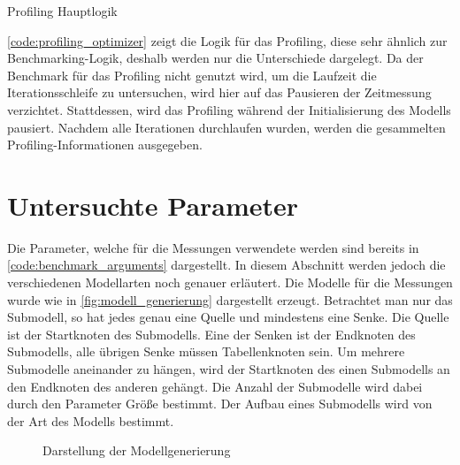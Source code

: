 \begin{listing}
    
\caption{Profiling Hauptlogik}
\label{code:profiling_optimizer}
\end{listing}

\autoref{code:profiling_optimizer} zeigt die Logik für das Profiling, diese
sehr ähnlich zur Benchmarking-Logik, deshalb werden nur die Unterschiede
dargelegt. Da der Benchmark für das Profiling nicht genutzt wird, um die
Laufzeit die Iterationsschleife zu untersuchen, wird hier auf das Pausieren der
Zeitmessung verzichtet. Stattdessen, wird das Profiling während der
Initialisierung des Modells pausiert. Nachdem alle Iterationen durchlaufen
wurden, werden die gesammelten Profiling-Informationen ausgegeben.

\section{Untersuchte Parameter}
Die Parameter, welche für die Messungen verwendete werden sind
bereits in \autoref{code:benchmark_arguments} dargestellt. In diesem Abschnitt
werden jedoch die verschiedenen Modellarten noch genauer erläutert.
Die Modelle für die Messungen wurde wie in \autoref{fig:modell_generierung}
dargestellt erzeugt. Betrachtet man nur das Submodell, so hat jedes genau eine
Quelle und mindestens eine Senke. Die Quelle ist der Startknoten des
Submodells. Eine der Senken ist der Endknoten des Submodells, alle übrigen
Senke müssen Tabellenknoten sein. Um mehrere Submodelle aneinander zu hängen,
wird der Startknoten des einen Submodells an den Endknoten des anderen
gehängt. Die Anzahl der Submodelle wird dabei durch den Parameter Größe
bestimmt. Der Aufbau eines Submodells wird von der Art des Modells bestimmt.


\begin{figure}[h]
    \begin{center}
        
    \end{center}
    \caption{Darstellung der Modellgenerierung}\label{fig:modell_generierung}
\end{figure}

